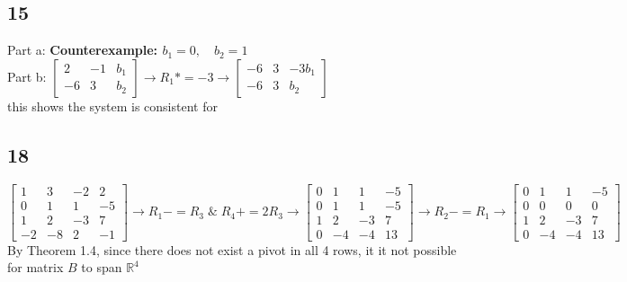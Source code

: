 \documentclass{article}
\begin{document}
\subsection*{15}
Part a: \textbf{Counterexample: $b_1=0,\quad b_2=1$}
\\Part b: $\begin{bmatrix}
    2&-1&b_1\\-6&3&b_2
\end{bmatrix}\rightarrow R_1 *=-3 \rightarrow \begin{bmatrix}
    -6&3&-3b_1\\-6&3&b_2
\end{bmatrix}$ \\[0.1in]this shows the system is consistent for \pagebreak
\subsection*{18}
$\begin{bmatrix}1 & 3 & -2 & 2 \\0 & 1 & 1 & -5 \\1 & 2 & -3 & 7 \\-2 & -8 & 2 & -1\end{bmatrix} \rightarrow R_1-=R_3 \; \& \; R_4+=2R_3\rightarrow 
\begin{bmatrix}0 & 1 & 1 & -5 \\0 & 1 & 1 & -5 \\1 & 2 & -3 & 7 \\0 & -4 & -4 & 13\end{bmatrix} \rightarrow R_2-=R_1\rightarrow
\begin{bmatrix}0 & 1 & 1 & -5 \\0 & 0 & 0 & 0 \\1 & 2 & -3 & 7 \\0 & -4 & -4 & 13\end{bmatrix}$
\\[0.1in]By Theorem 1.4, since there does not exist a pivot in all 4 rows, it it not possible for matrix $B$ to span $\mathbb{R}^4$
\end{document}
